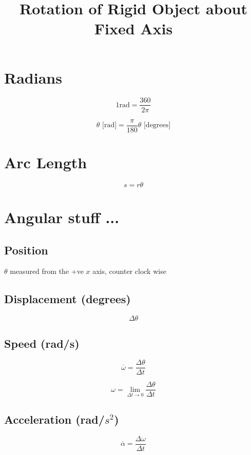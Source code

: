 \documentclass[12pt]{article}
\title{\textbf{Rotation of Rigid Object about Fixed Axis}}
\date{}
\begin{document}
\maketitle

\begin{spacing}{1.5}

\section{Radians}

$$1 \textrm{rad} = \frac{360}{2\pi}$$

$$\theta \textrm{ [rad]} = \frac{\pi}{180} \theta \textrm{ [degrees]}$$

\section{Arc Length}

$$s = r \theta$$

\section{Angular stuff ...}

\subsection{Position}

$\theta$ measured from the +ve $x$ axis, counter clock wise

\subsection{Displacement (degrees)}

$$\Delta \theta$$

\subsection{Speed (rad/s)}

$$\overline{\omega} = \frac{\Delta \theta}{\Delta t}$$

$$\omega = \lim_{\Delta t \to 0} \frac{\Delta \theta}{\Delta t}$$

\subsection{Acceleration (rad/$s^2$)}

$$\overline{\alpha} = \frac{\Delta \omega}{\Delta t}$$


\end{spacing}
\end{document}
